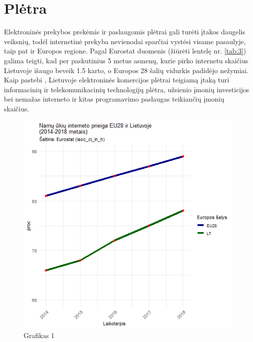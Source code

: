 \documentclass[12pt, titlepage]{article}
\begin{document}
\section{Plėtra}
\smallskip
\par
\hspace{\parindent}
Elektroninės prekybos prekėmis ir paslaugomis plėtrai gali turėti įtakos daugelis veiksnių, todėl internetinė prekyba nevienodai sparčiai vystėsi visame pasaulyje, taip pat ir Europos regione. Pagal Eurostat duomenis (žiūrėti lentelę nr. \ref{tab:3}) galima teigti, kad per paskutinius 5 metus asmenų, kurie pirko internetu skaičius Lietuvoje išaugo beveik 1.5 karto, o Europos 28 šalių vidurkis padidėjo nežymiai. Kaip pastebi \textcite{klapatauskiene2013elektronines}, Lietuvoje elektroninės komercijos plėtrai teigiamą įtaką turi informacinių ir telekomunikacinių technologijų plėtra, užsienio įmonių investicijos bei nemažas interneto ir kitas programavimo paslaugas teikiančių įmonių skaičius. 
\medskip
\begin{figure}[H]
\center
\includegraphics[scale=0.9]{Grafikai/4.png} 
\caption{Grafikas 1}
\label{fig:1}
\end{figure}
\bigskip
\end{document}

